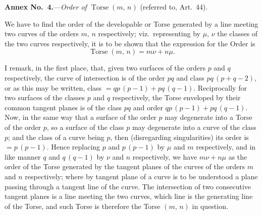 \documentclass[11pt,a4paper]{article}
\providecommand{\Torse}{\operatorname{Torse}}
\begin{document}
\bigskip

\begin{center}
\textbf{Annex No.~4.}---\textit{Order of $\Torse(m,\,n)$} (referred to, Art.~44).
\end{center}

We have to find the order of the developable or Torse generated by a line meeting two curves of the orders $m,\,n$ respectively; viz.\ representing by $\mu,\,\nu$ the classes of the two curves respectively, it is to be shown that the expression for the Order is
\[
\Torse(m,\,n) = m\nu + n\mu.
\]

I remark, in the first place, that, given two surfaces of the orders $p$ and $q$ respectively, the curve of intersection is of the order $pq$ and class $pq\,(p+q-2)$, or as this may be written, class $= qp\,(p-1) + pq\,(q-1)$. Reciprocally for two surfaces of the classes $p$ and $q$ respectively, the Torse enveloped by their common tangent planes is of the class $pq$ and order $qp\,(p-1) + pq\,(q-1)$. Now, in the same way that a surface of the order $p$ may degenerate into a Torse of the order $p$, so a surface of the class $p$ may degenerate into a curve of the class $p$; and the class of a curve being $p$, then (disregarding singularities) its order is $= p\,(p-1)$. Hence replacing $p$ and $p\,(p-1)$ by $\mu$ and $m$ respectively, and in like manner $q$ and $q\,(q-1)$ by $\nu$ and $n$ respectively, we have $m\nu + n\mu$ as the order of the Torse generated by the tangent planes of the curves of the orders $m$ and $n$ respectively; where by tangent plane of a curve is to be understood a plane passing through a tangent line of the curve. The intersection of two consecutive tangent planes is a line meeting the two curves, which line is the generating line of the Torse, and such Torse is therefore the Torse $(m,\,n)$ in question.

\medskip
\end{document}
